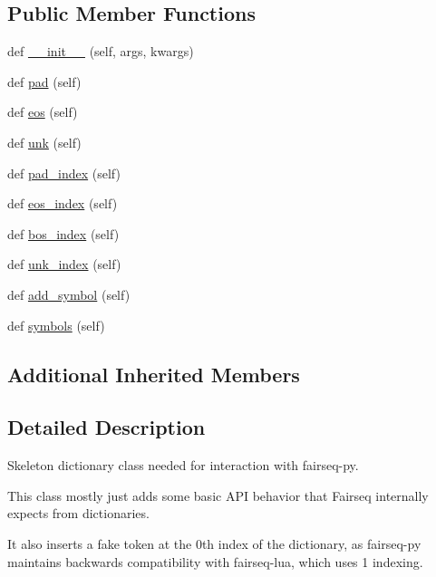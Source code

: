 \subsection*{Public Member Functions}
\begin{DoxyCompactItemize}
\item 
def \hyperlink{classparlai_1_1agents_1_1fairseq_1_1fairseq_1_1__FairseqDictionary_ac92ccf75b3d43ba887fa828935f30fd4}{\+\_\+\+\_\+init\+\_\+\+\_\+} (self, args, kwargs)
\item 
def \hyperlink{classparlai_1_1agents_1_1fairseq_1_1fairseq_1_1__FairseqDictionary_a8687767f003b2a054d32690d820d2702}{pad} (self)
\item 
def \hyperlink{classparlai_1_1agents_1_1fairseq_1_1fairseq_1_1__FairseqDictionary_ab2d56873ca754183f48c20989267c2c4}{eos} (self)
\item 
def \hyperlink{classparlai_1_1agents_1_1fairseq_1_1fairseq_1_1__FairseqDictionary_ac19b90d1ca9ce19375611e8762d99ca0}{unk} (self)
\item 
def \hyperlink{classparlai_1_1agents_1_1fairseq_1_1fairseq_1_1__FairseqDictionary_a9712a14ee88222b6e8f97c14326f1082}{pad\+\_\+index} (self)
\item 
def \hyperlink{classparlai_1_1agents_1_1fairseq_1_1fairseq_1_1__FairseqDictionary_acc903d30c550b92cf81527cac655af0f}{eos\+\_\+index} (self)
\item 
def \hyperlink{classparlai_1_1agents_1_1fairseq_1_1fairseq_1_1__FairseqDictionary_af654971968b2015535d863a82552f3bb}{bos\+\_\+index} (self)
\item 
def \hyperlink{classparlai_1_1agents_1_1fairseq_1_1fairseq_1_1__FairseqDictionary_a88951657d4bafce880b591db77e65606}{unk\+\_\+index} (self)
\item 
def \hyperlink{classparlai_1_1agents_1_1fairseq_1_1fairseq_1_1__FairseqDictionary_a6e46136d9d2c65d628d8692b941d48bf}{add\+\_\+symbol} (self)
\item 
def \hyperlink{classparlai_1_1agents_1_1fairseq_1_1fairseq_1_1__FairseqDictionary_a0e88f40d62d0d5de92deb78b7e5597ba}{symbols} (self)
\end{DoxyCompactItemize}
\subsection*{Additional Inherited Members}


\subsection{Detailed Description}
\begin{DoxyVerb}Skeleton dictionary class needed for interaction with fairseq-py.

This class mostly just adds some basic API behavior that Fairseq internally
expects from dictionaries.

It also inserts a fake token at the 0th index of the dictionary, as
fairseq-py maintains backwards compatibility with fairseq-lua, which uses
1 indexing.
\end{DoxyVerb}
 

